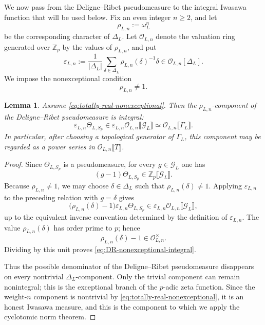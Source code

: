 \documentclass[11pt,table]{amsart}
\newtheorem{lemma}[theorem]{Lemma}
\numberwithin{equation}{section}
\begin{document}
\par We now pass from the Deligne--Ribet pseudomeasure to the integral
Iwasawa function that will be used below.  Fix an even integer
\(n\geq2\), and let
\begin{equation}\label{rhoLndefn}\rho_{L,n}:=\omega_L^n
\end{equation}
be the corresponding character of \(\Delta_L\).  Let
\(\mathcal O_{L,n}\) denote the valuation ring generated over
\(\mathbb Z_p\) by the values of \(\rho_{L,n}\), and put
\[
        \varepsilon_{L,n}
        :=
        \frac{1}{|\Delta_L|}
        \sum_{\delta\in\Delta_L}
        \rho_{L,n}(\delta)^{-1}\delta
        \in
        \mathcal O_{L,n}[\Delta_L].
\]
We impose the nonexceptional condition
\begin{equation}
\label{eq:totally-real-nonexceptional}
        \rho_{L,n}\neq1.
\end{equation}

\begin{lemma}
\label{lem:DR-nonexceptional-integral}
Assume \eqref{eq:totally-real-nonexceptional}.  Then the
\(\rho_{L,n}\)-component of the Deligne--Ribet pseudomeasure is integral:
\begin{equation}
\label{eq:DR-nonexceptional-integral}
        \varepsilon_{L,n}\Theta_{L,S_p}
        \in
        \varepsilon_{L,n}
        \mathcal O_{L,n}
        \llbracket\mathcal G_L\rrbracket
        \simeq
        \mathcal O_{L,n}\llbracket\Gamma_L\rrbracket.
\end{equation}
In particular, after choosing a topological generator of \(\Gamma_L\),
this component may be regarded as a power series in
\(\mathcal O_{L,n}\llbracket T\rrbracket\).
\end{lemma}

\begin{proof}
Since \(\Theta_{L,S_p}\) is a pseudomeasure, for every
\(g\in\mathcal G_L\) one has
\[
        (g-1)\Theta_{L,S_p}
        \in
        \mathbb Z_p\llbracket\mathcal G_L\rrbracket.
\]
Because \(\rho_{L,n}\neq1\), we may choose
\(\delta\in\Delta_L\) such that
\(\rho_{L,n}(\delta)\neq1\).  Applying \(\varepsilon_{L,n}\) to the preceding
relation with \(g=\delta\) gives
\[
        \bigl(\rho_{L,n}(\delta)-1\bigr)
        \varepsilon_{L,n}\Theta_{L,S_p}
        \in
        \varepsilon_{L,n}
        \mathcal O_{L,n}\llbracket\mathcal G_L\rrbracket,
\]
up to the equivalent inverse convention determined by the definition of
\(\varepsilon_{L,n}\).  The value \(\rho_{L,n}(\delta)\) has order prime to \(p\);
hence
\[
        \rho_{L,n}(\delta)-1
        \in
        \mathcal O_{L,n}^{\times}.
\]
Dividing by this unit proves \eqref{eq:DR-nonexceptional-integral}.

Thus the possible denominator of the Deligne--Ribet pseudomeasure
disappears on every nontrivial \(\Delta_L\)-component.  Only the trivial
component can remain nonintegral; this is the exceptional branch of the
\(p\)-adic zeta function.  Since the weight-\(n\) component is
nontrivial by \eqref{eq:totally-real-nonexceptional}, it is an honest
Iwasawa measure, and this is the component to which we apply the
cyclotomic norm theorem.
\end{proof}
\end{document}
